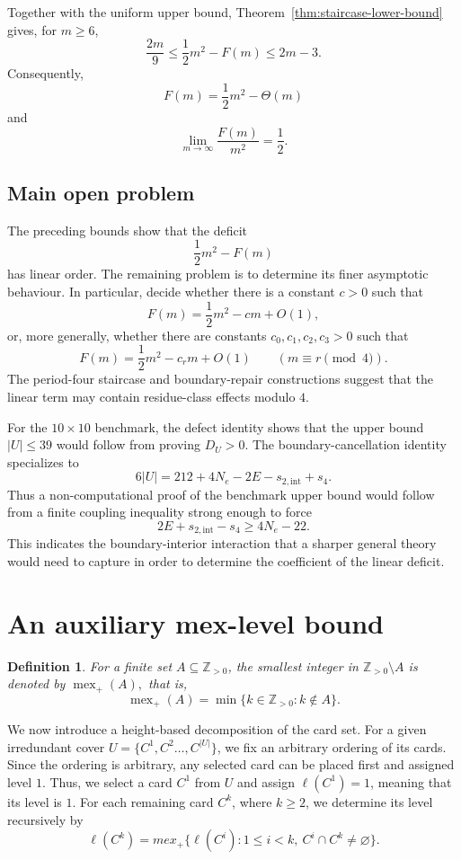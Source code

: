 \documentclass[11pt]{article}
\newtheorem{definition}[theorem]{Definition}
\DeclareMathOperator{\mex}{mex}
\begin{document}
	
	
	
	
	
	
	Together with the uniform upper bound, Theorem~\ref{thm:staircase-lower-bound}
	gives, for \(m\ge6\),
	\[
	\frac{2m}{9}
	\le
	\frac12m^2-F(m)
	\le
	2m-3.
	\]
	Consequently,
	\[
	{F(m)=\frac12m^2-\Theta(m)}
	\]
	and
	\[
	\lim_{m\to\infty}\frac{F(m)}{m^2}=\frac12.
	\]
	
	
	\subsection*{Main open problem}
	
	The preceding bounds show that the deficit
	\[
	\frac12m^2-F(m)
	\]
	has linear order.  The remaining problem is to determine its finer asymptotic
	behaviour.  In particular, decide whether there is a constant \(c>0\) such
	that
	\[
	F(m)=\frac12m^2-cm+O(1),
	\]
	or, more generally, whether there are constants \(c_0,c_1,c_2,c_3>0\) such
	that
	\[
	F(m)=\frac12m^2-c_r m+O(1)
	\qquad(m\equiv r\pmod4).
	\]
	The period-four staircase and boundary-repair constructions suggest that the
	linear term may contain residue-class effects modulo \(4\).
	
	For the \(10\times10\) benchmark, the defect identity shows that the upper
	bound \(|U|\le39\) would follow from proving \(D_U>0\).  The boundary-cancellation
	identity specializes to
	\[
	6|U|=212+4N_e-2E-s_{2,\mathrm{int}}+s_4.
	\]
	Thus a non-computational proof of the benchmark upper bound would follow from
	a finite coupling inequality strong enough to force
	\[
	2E+s_{2,\mathrm{int}}-s_4\ge4N_e-22.
	\]
	This indicates the boundary-interior interaction that a sharper general theory
	would need to capture in order to determine the coefficient of the linear
	deficit.
	
	\appendix
	\section{An auxiliary mex-level bound}
	\label{app:mex}
	
	
	\begin{definition}
		For a finite set \(A\subseteq\mathbb Z_{>0}\), the smallest integer in $\mathbb{Z}_{>0} \setminus A$ is denoted by $\mex_+(A),$ that is,
		\[
		\mex_+(A)=\min\{k\in\mathbb Z_{>0}:k\notin A\}.
		\]
	\end{definition}
	
	
	We now introduce a height-based decomposition of the card set. For a given irredundant cover \( U=\{C^1,C^2\ldots,C^{|U|}\}\), we fix an arbitrary ordering of its cards. Since the ordering is arbitrary, any selected card can be placed first and assigned level \(1\). Thus, we select a card \(C^1\) from \(U\) and assign \(\ell(C^1)=1\), meaning that its level is \(1\). For each remaining card \(C^k\), where \(k\geq2\), we determine its level recursively by
	\[
	\ell(C^k)
	=
	mex_+
	\{\ell(C^i):1\le i<k,\ C^i\cap C^k\neq\varnothing\}.
	\]
	
\end{document}
